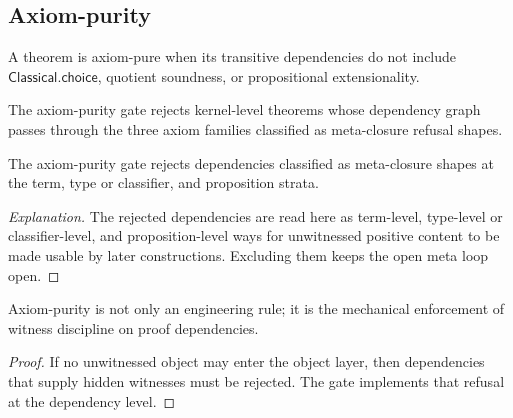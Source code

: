 \subsection{Axiom-purity}
\label{subsec:philosophy-axiom-purity}

\begin{definition}
\label{def:philosophy-axiom-pure-theorem}
A theorem is axiom-pure when its transitive dependencies do not include
\(\mathsf{Classical.choice}\), quotient soundness, or propositional
extensionality.
\end{definition}

\begin{definition}
\label{def:philosophy-axiom-purity-gate}
The axiom-purity gate rejects kernel-level theorems whose dependency
graph passes through the three axiom families classified as
meta-closure refusal shapes.
\end{definition}

\begin{principle}
\label{thm:philosophy-axiom-purity-rejects-meta-closure}
The axiom-purity gate rejects dependencies classified as meta-closure
shapes at the term, type or classifier, and proposition strata.
\end{principle}
\begin{proof}[Explanation]
The rejected dependencies are read here as term-level, type-level or
classifier-level, and proposition-level ways for unwitnessed positive
content to be made usable by later constructions. Excluding them keeps
the open meta loop open.
\end{proof}

\begin{corollary}
\label{cor:philosophy-gate-philosophical-discipline}
Axiom-purity is not only an engineering rule; it is the mechanical
enforcement of witness discipline on proof dependencies.
\end{corollary}
\begin{proof}
If no unwitnessed object may enter the object layer, then dependencies
that supply hidden witnesses must be rejected. The gate implements that
refusal at the dependency level.
\end{proof}


